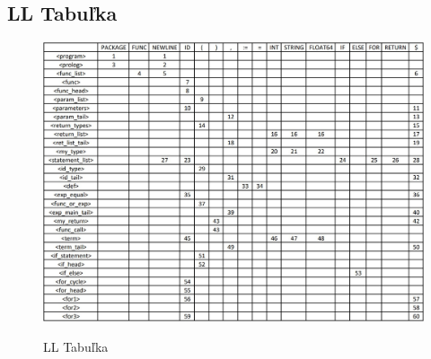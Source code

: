 \documentclass[a4paper,11pt]{article}
\begin{document}
		\subsection{LL Tabuľka}\label{subsec:lltable}

			\begin{figure}[h]
				\centering
				\includegraphics[width = 15cm]{LL_Tabulka.jpg}\\
				\caption{LL Tabuľka}
				\label{fig:lltable}
			\end{figure}
		\cleardoublepage
\end{document}
